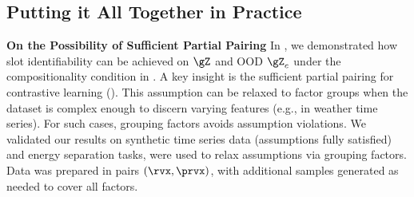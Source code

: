 \documentclass{article} %
\theoremstyle{plain}
\theoremstyle{definition}
\theoremstyle{remark}
\numberwithin{equation}{section}
\begin{document}
\subsection{Putting it All Together in Practice}\label{sec:implementation_loss}

\textbf{On the Possibility of Sufficient Partial Pairing} In , we demonstrated how slot identifiability can be achieved on $\gZ$ and OOD $\gZ_c$ under the compositionality condition in . A key insight is the sufficient partial pairing for contrastive learning (). This assumption can be relaxed to factor groups when the dataset is complex enough to discern varying features (e.g., in weather time series). For such cases, grouping factors avoids assumption violations. We validated our results on synthetic time series data (assumptions fully satisfied) and energy separation tasks, were used to relax assumptions via grouping factors. Data was prepared in pairs $(\rvx, \prvx)$, with additional samples generated as needed to cover all factors.\par
\end{document}
